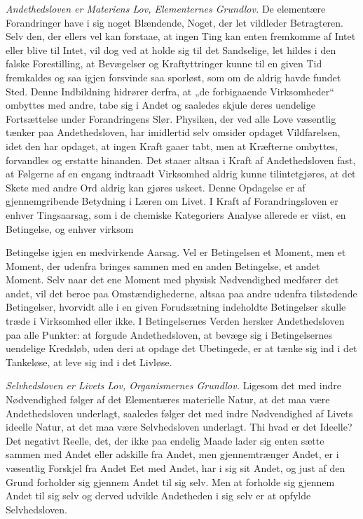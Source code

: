 \documentclass[12pt,a4paper]{book}
\begin{document}
\emph{Andethedsloven er Materiens Lov, Elementernes Grundlov.} De elementære
Forandringer have i sig noget Blændende, Noget, der let vildleder Betragteren.
Selv den, der ellers vel kan forstaae, at ingen Ting kan enten fremkomme af
Intet eller blive til Intet, vil dog ved at holde sig til det Sandselige, let
hildes i den falske Forestilling, at Bevægelser og Kraftyttringer kunne til en
given Tid fremkaldes og saa igjen forsvinde saa sporløst, som om de aldrig
havde fundet Sted. Denne Indbildning hidrører derfra, at „de forbigaaende
Virksomheder“ ombyttes med andre, tabe sig i Andet og saaledes skjule deres
uendelige Fortsættelse under Forandringens Slør. Physiken, der ved alle Love
væsentlig tænker paa Andethedsloven, har imidlertid selv omsider opdaget
Vildfarelsen, idet den har opdaget, at ingen Kraft gaaer tabt, men at
Kræfterne ombyttes, forvandles og erstatte hinanden. Det staaer altsaa i Kraft
af Andethedsloven fast, at Følgerne af en engang indtraadt Virksomhed aldrig
kunne tilintetgjøres, at det Skete med andre Ord aldrig kan gjøres uskeet.
Denne Opdagelse er af gjennemgribende Betydning i Læren om Livet. I Kraft af
Forandringsloven er enhver Tingsaarsag, som i de chemiske Kategoriers Analyse
allerede er viist, en Betingelse, og enhver virksom

Betingelse igjen en medvirkende Aarsag. Vel er Betingelsen et Moment, men et
Moment, der udenfra bringes sammen med en anden Betingelse, et andet Moment.
Selv naar det ene Moment med physisk Nødvendighed medfører det andet, vil det
beroe paa Omstændighederne, altsaa paa andre udenfra tilstødende Betingelser,
hvorvidt alle i en given Forudsætning indeholdte Betingelser skulle træde i
Virksomhed eller ikke. I Betingelsernes Verden hersker Andethedsloven paa alle
Punkter: at forgude Andethedsloven, at bevæge sig i Betingelsernes uendelige
Kredsløb, uden deri at opdage det Ubetingede, er at tænke sig ind i det
Tankeløse, at leve sig ind i det Livløse.

\emph{Selvhedsloven er Livets Lov, Organismernes Grundlov.} Ligesom det med
indre Nødvendighed følger af det Elementæres materielle Natur, at det maa være
Andethedsloven underlagt, saaledes følger det med indre Nødvendighed af Livets
ideelle Natur, at det maa være Selvhedsloven underlagt. Thi hvad er det
Ideelle? Det negativt Reelle, det, der ikke paa endelig Maade lader sig enten
sætte sammen med Andet eller adskille fra Andet, men gjennemtrænger Andet, er i
væsentlig Forskjel fra Andet Eet med Andet, har i sig sit Andet, og just af den
Grund forholder sig gjennem Andet til sig selv. Men at forholde sig gjennem
Andet til sig selv og derved udvikle Andetheden i sig selv er at opfylde
Selvhedsloven.
\end{document}
